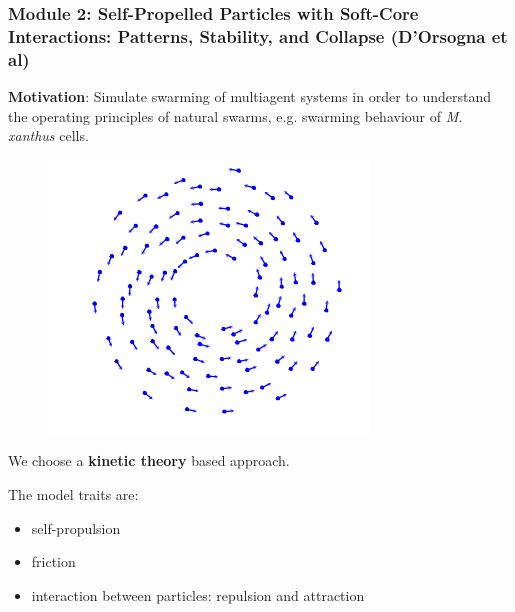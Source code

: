 \documentclass[compress]{beamer}
\begin{document}
\begin{frame}
  \frametitle{Module 2: Self-Propelled Particles with Soft-Core Interactions: Patterns, Stability, and Collapse (D'Orsogna et al)}
  
  \textbf{Motivation}: Simulate swarming of multiagent systems in order to understand the operating principles of natural swarms, e.g. swarming behaviour of \textit{M. xanthus} cells. \\ 
  
  
  \begin{figure}
  		\includegraphics[width=0.18\columnwidth]{./img/mill.png}
  		\label{mill}
  \end{figure}



  We choose a \textbf{kinetic theory} based approach.\\

\hspace{3cm}

  The model traits are:
  \begin{itemize}
  	\item self-propulsion
  	\item friction 
  	\item interaction between particles: repulsion and attraction
  \end{itemize}
 
%

\end{frame}
\end{document}
